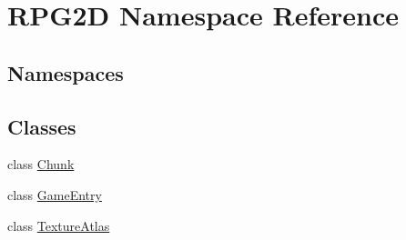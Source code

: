 \hypertarget{namespace_r_p_g2_d}{}\section{R\+P\+G2D Namespace Reference}
\label{namespace_r_p_g2_d}
\subsection*{Namespaces}
\begin{DoxyCompactItemize}
\end{DoxyCompactItemize}
\subsection*{Classes}
\begin{DoxyCompactItemize}
\item 
class \mbox{\hyperlink{class_r_p_g2_d_1_1_chunk}{Chunk}}
\item 
class \mbox{\hyperlink{class_r_p_g2_d_1_1_game_entry}{Game\+Entry}}
\item 
class \mbox{\hyperlink{class_r_p_g2_d_1_1_texture_atlas}{Texture\+Atlas}}
\end{DoxyCompactItemize}
